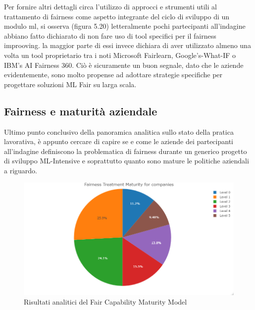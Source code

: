     Per fornire altri dettagli circa l'utilizzo di approcci e strumenti utili al trattamento di fairness come aspetto integrante del ciclo di sviluppo di un modulo ml, si osserva (figura 5.20) letteralmente pochi partecipanti all'indagine abbiano fatto dichiarato di non fare uso di tool specifici per il fairness improoving. la maggior parte di essi invece dichiara di aver utilizzato almeno una volta un tool proprietario tra i noti Microsoft Fairlearn, Google's-What-IF o IBM's AI Fairness 360. Ciò è sicuramente un buon segnale, dato che le aziende evidentemente, sono molto propense ad adottare strategie specifiche per progettare soluzioni ML Fair su larga scala.
    \subsection{Fairness e maturità aziendale}
    
    \begin{center}
    	\hspace*{-5mm}%
    \end{center}
    
    Ultimo punto conclusivo della panoramica analitica sullo stato della pratica lavorativa, è appunto cercare di capire se e come le aziende dei partecipanti all'indagine definiscono la problematica di fairness durante un generico progetto di sviluppo ML-Intensive e soprattutto quanto sono mature le politiche aziendali a riguardo. 
    
    \begin{figure}[h!]
        \centering
        \includegraphics[width=1\textwidth]{figure/Analisi/RQ5/Fairness Treatment Maturity for companies.png}
        \caption{Risultati analitici del Fair Capability Maturity Model}
    \end{figure}
    
